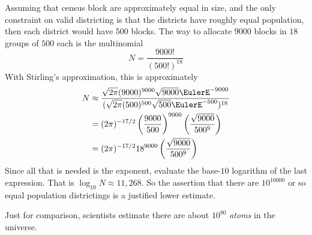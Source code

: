 \documentclass[12pt]{article}
\begin{document}
\begin{solution}
    Assuming that census block are approximately equal in size, and the
    only constraint on valid districting is that the districts have
    roughly equal population, then each district would have \( 500 \)
    blocks.  The way to allocate \( 9000 \) blocks in \( 18 \) groups of
    \( 500 \) each is the multinomial
    \[
        N = \frac{9000!}{(500!)^{18}}
    \] With Stirling's approximation, this is approximately
    \begin{align*}
        N &\approx \frac{\sqrt{2\pi} (9000)^{9000} \sqrt{9000} \EulerE^{-9000}}
        {(\sqrt{2\pi} (500)^{500} \sqrt{500} \EulerE^{-500})^{18}} \\
        &= (2\pi)^{-17/2} \left( \frac{9000}{500} \right)^{9000} \left(
        \frac{\sqrt{9000}}{500^{9}} \right) \\
        &= (2\pi)^{-17/2} 18^{9000} \left( \frac{\sqrt{9000}}{500^{9}}
        \right) \\
    \end{align*}
    Since all that is needed is the exponent, evaluate the base-\( 10 \)
    logarithm of the last expression.  That is \( \log_{10} N \approx 11
    {,}268 \).  So the assertion that there are \( 10^{10000} \) or so
    equal population districtings is a justified lower estimate.

    Just for comparison, scientists estimate there are about \( 10^{80} \)
    \emph{atoms} in the universe.
  \end{solution}
\end{document}
